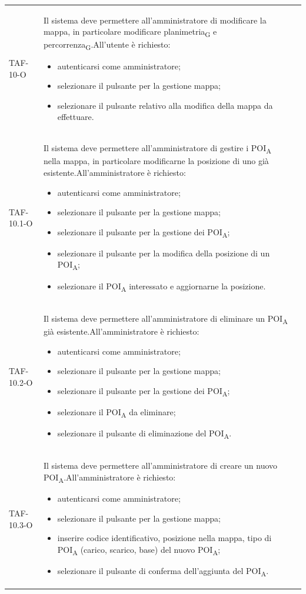 \begin{longtable}{ >{\centering}p{} >{}p{}
		>{\centering}p{}}
	TAF-10-O & Il sistema deve permettere all'amministratore di modificare la mappa, in particolare modificare planimetria\textsubscript{G} e percorrenza\textsubscript{G}.\newline All'utente è richiesto: \begin{itemize} \item autenticarsi come amministratore; \item selezionare il pulsante per la gestione mappa; \item selezionare il pulsante relativo alla modifica della mappa da effettuare.\end{itemize} & 0\tabularnewline
	TAF-10.1-O & Il sistema deve permettere all'amministratore di gestire i POI\textsubscript{A} nella mappa, in particolare modificarne la posizione di uno già esistente.\newline All'amministratore è richiesto: \begin{itemize}\item autenticarsi come amministratore; \item selezionare il pulsante per la gestione mappa; \item selezionare il pulsante per la gestione dei POI\textsubscript{A}; \item selezionare il pulsante per la modifica della posizione di un POI\textsubscript{A}; \item selezionare il POI\textsubscript{A} interessato e aggiornarne la posizione.\end{itemize} & 0\tabularnewline
	TAF-10.2-O & Il sistema deve permettere all'amministratore di eliminare un POI\textsubscript{A} già esistente.\newline All'amministratore è richiesto: \begin{itemize}\item autenticarsi come amministratore; \item selezionare il pulsante per la gestione mappa; \item selezionare il pulsante per la gestione dei POI\textsubscript{A}; \item selezionare il POI\textsubscript{A} da eliminare; \item selezionare il pulsante di eliminazione del POI\textsubscript{A}.\end{itemize} & 0\tabularnewline
	TAF-10.3-O & Il sistema deve permettere all'amministratore di creare un nuovo POI\textsubscript{A}.\newline All'amministratore è richiesto: \begin{itemize}\item autenticarsi come amministratore; \item selezionare il pulsante per la gestione mappa; \item inserire codice identificativo, posizione nella mappa, tipo di POI\textsubscript{A} (carico, scarico, base) del nuovo POI\textsubscript{A}; \item selezionare il pulsante di conferma dell'aggiunta del POI\textsubscript{A}.\end{itemize} & 0\tabularnewline


\end{longtable}

